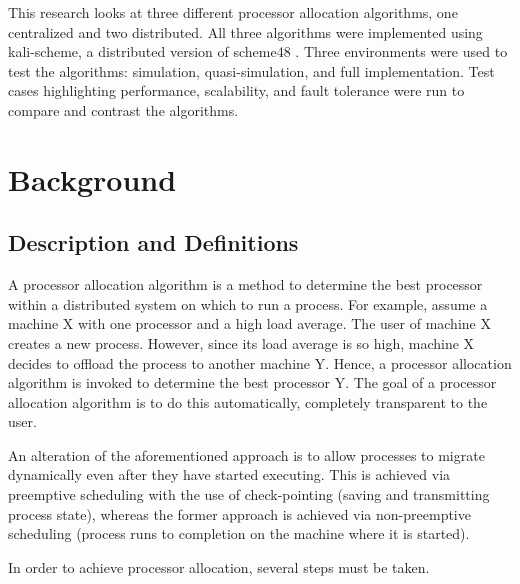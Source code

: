 \documentclass{report}
\begin{document}
This research looks at three different processor allocation algorithms, one
centralized and two distributed.  All three algorithms were implemented
using kali-scheme, a distributed version of scheme48 \cite{kali}.  Three
environments were used to test the algorithms: simulation, quasi-simulation,
and full implementation.  Test cases highlighting performance, scalability,
and fault tolerance were run to compare and contrast the algorithms.






\chapter{Background}


\section{Description and Definitions}


A processor allocation algorithm is a method to determine the best processor
within a distributed system on which to run a process.  For example, assume
a machine X with one processor and a high load average.  The user of machine
X creates a new process.  However, since its load average is so high,
machine X decides to offload the process to another machine Y.  Hence, a
processor allocation algorithm is invoked to determine the best processor Y.
The goal of a processor allocation algorithm is to do this automatically,
completely transparent to the user.

An alteration of the aforementioned approach is to allow processes to
migrate dynamically even after they have started executing.  This is
achieved via preemptive scheduling with the use of check-pointing (saving and
transmitting process state), whereas the former approach is achieved via
non-preemptive scheduling (process runs to completion on the machine where
it is started).

In order to achieve processor allocation, several steps must be taken.
\end{document}
